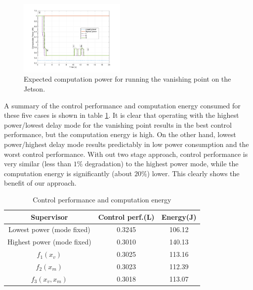 \begin{figure}[hbtp]
\centering
\includegraphics[width=0.46\textwidth]{../simulations/figs/power.pdf}
\caption{Expected computation power for running the vanishing point on the Jetson.}
\label{fig:power} 
\end{figure}






A summary of the control performance and computation energy consumed for these five cases is shown in table \ref{tbl:performance}. It is clear that operating with the highest power/lowest delay mode for the vanishing point results in the best control performance, but the computation energy is high. On the other hand, lowest power/highest delay mode results predictably in low power consumption and the worst control performance. With out two stage approach, control performance is very similar (less than $1\%$ degradation) to the highest power mode, while the computation energy is significantly (about $20\%$) lower. This clearly shows the benefit of our approach.

\begin{table}[htb]
\begin{center}
\caption{Control performance and computation energy}
\label{tbl:performance}
\begin{tabular} {|c|c|c|}
	\hline
	\textbf{Supervisor} & \textbf{Control perf.}(L) & \textbf{Energy}(J) \\ \hline
	Lowest power (mode fixed) & 0.3245 & 106.12  \\ \hline
	Highest power (mode fixed) & 0.3010 & 140.13  \\ \hline
	 $f_1(x_v)$ & 0.3025 & 113.16  \\ \hline
	 $f_2(x_m)$ & 0.3023 & 112.39 \\ \hline
	 $f_3(x_v,x_m)$ & 0.3018 & 113.07 \\ \hline
	 
\end{tabular}
	\vspace{-10pt}	
	\end{center}
\end{table}


